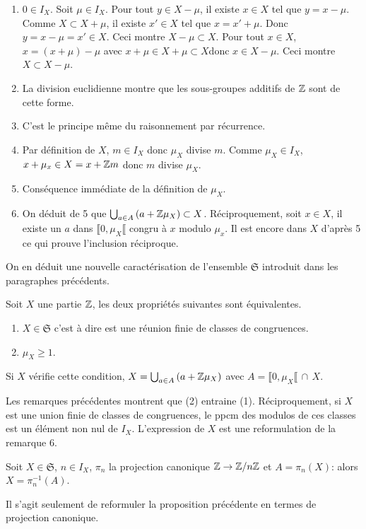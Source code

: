 \begin{demo}
  \begin{enumerate}
    \item $0\in I_X$.\newline
    Soit $\mu \in I_X$.\newline
      Pour tout $y \in X-\mu$, il existe $x \in X$ tel que $y=x-\mu$. Comme $X \subset X + \mu$, il existe $x'\in X$ tel que
$x = x' + \mu$. Donc $y = x - \mu =x'\in X$. Ceci montre $X - \mu \subset X$.\newline
      Pour tout $x \in X$, $x = (x + \mu) - \mu$ avec $x + \mu \in X + \mu \subset X$donc $x \in X - \mu$. Ceci montre $X \subset X - \mu$.
    \item La division euclidienne montre que les sous-groupes additifs de $\mathbb{Z}$ sont de cette forme.
    \item C'est le principe même du raisonnement par récurrence.
    \item Par définition de $X$, $m \in I_X$ donc $\mu_X$ divise $m$. Comme $\mu_X \in I_X$, $x + \mu_x \in X = x +\mathbb{Z} m$ donc $m$ divise $\mu_X$.
    \item Conséquence immédiate de la définition de $\mu_X$.
    \item On déduit de 5 que $\bigcup_{a \in A}\left(a + \mathbb{Z} \mu_X\right) \subset X$. Réciproquement, soit $x\in X$, il existe un $a$ dans $\llbracket 0, \mu_X \llbracket$ congru à $x$ modulo $\mu_x$. Il est encore dans $X$ d'après 5 ce qui prouve l'inclusion réciproque.
  \end{enumerate}
\end{demo}
On en déduit une nouvelle caractérisation de l'ensemble $\mathfrak{S}$ introduit dans les paragraphes précédents.
\begin{propn}
  Soit $X$ une partie $\mathbb{Z}$, les deux propriétés suivantes sont équivalentes.
\begin{enumerate}
  \item $X \in \mathfrak{S}$ c'est à dire est une réunion finie de classes de congruences.
  \item $\mu_X \geq 1$.
\end{enumerate}
Si $X$ vérifie cette condition, $X = \bigcup_{a \in A}\left(a + \mathbb{Z} \mu_X\right)$  avec $A  = \llbracket 0 , \mu_X \llbracket \,\cap \, X$.
\end{propn}
\begin{demo}
  Les remarques précédentes montrent que (2) entraine (1). Réciproquement, si $X$ est une union finie de classes de congruences, le ppcm des modulos de ces classes est un élément non nul de $I_X$. L'expression de $X$ est une reformulation de la remarque 6.
\end{demo}
\begin{propn}
  Soit $X \in \mathfrak{S}$, $n \in I_X$, $\pi_n$ la projection canonique $\mathbb{Z} \rightarrow \mathbb{Z} / n\mathbb{Z}$ et $A = \pi_n(X)$: alors $X = \pi_n^{-1}(A)$.
\end{propn}
\begin{demo}
  Il s'agit seulement de reformuler la proposition précédente en termes de projection canonique.
\end{demo}

